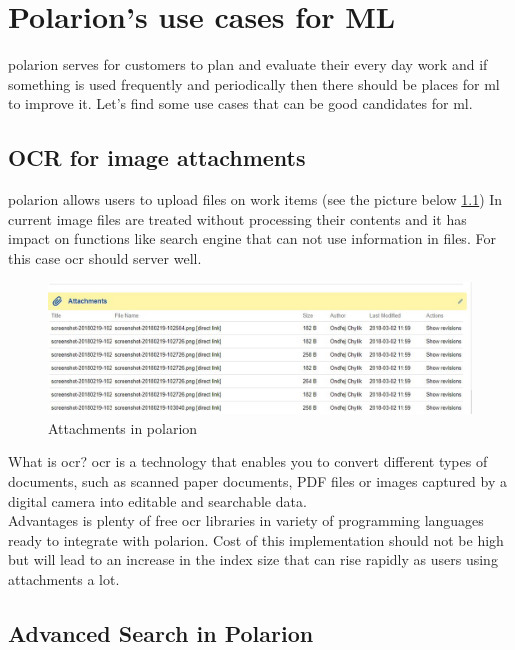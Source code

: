 \documentclass[thesis=M,english]{FITthesis}[2012/06/26]
\begin{document}
\chapter{Polarion's use cases for ML}

\acrshort{polarion} serves for customers to plan and evaluate their every day work and if something is used frequently and periodically then there should be places for \acrshort{ml} to improve it. Let's find some use cases that can be good candidates for \acrshort{ml}. 

\section{OCR for image attachments}

\acrshort{polarion} allows users to upload files on work items (see the picture below \ref{fig:polarion_attachments}) In current image files are treated without processing their contents and it has impact on functions like search engine that can not use information in files. For this case \acrshort{ocr} should server well.

\begin{figure}[h!]\centering
	\includegraphics[width=1\textwidth]{pictures/polarion_attachments}
	\caption{Attachments in \acrshort{polarion}}\label{fig:polarion_attachments}
\end{figure}

What is \acrshort{ocr}? \acrshort{ocr} is a technology that enables you to convert different types of documents, such as scanned paper documents, PDF files or images captured by a digital camera into editable and searchable data. \\

Advantages is plenty of free \acrshort{ocr} libraries in variety of programming languages ready to integrate with \acrshort{polarion}. Cost of this implementation should not be high but will lead to an increase in the index size that can rise rapidly as users using attachments a lot.  

\section{Advanced Search in Polarion}
\end{document}
